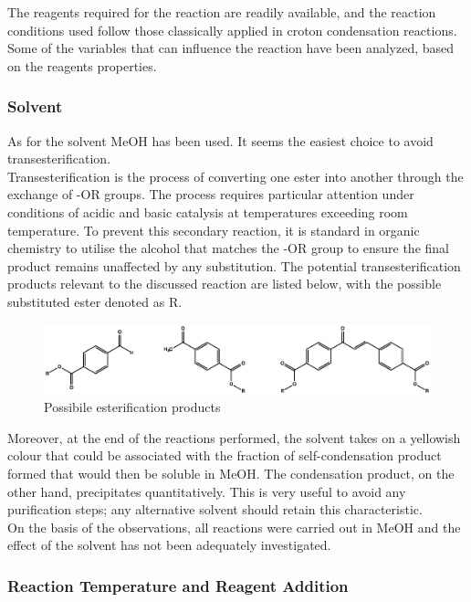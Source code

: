 \documentclass[../Master.tex]{subfiles}
\begin{document}
The reagents required for the reaction are readily available, and the reaction conditions used follow those classically applied in croton condensation reactions. Some of the variables that can influence the reaction have been analyzed, based on the reagents properties.

\subsubsection{Solvent}

As for the solvent MeOH has been used. It seems the easiest choice to avoid transesterification.\\
Transesterification is the process of converting one ester into another through the exchange of -OR groups. The process requires particular attention under conditions of acidic and basic catalysis at temperatures exceeding room temperature. To prevent this secondary reaction, it is standard in organic chemistry to utilise the alcohol that matches the -OR group to ensure the final product remains unaffected by any substitution.
The potential transesterification products relevant to the discussed reaction are listed below, with the possible substituted ester denoted as R.

\begin{figure}[h!]
	\centering
	\includegraphics[width=16cm,keepaspectratio]{Structures/esterification.eps}
	\caption{Possibile esterification products}
\end{figure}

Moreover, at the end of the reactions performed, the solvent takes on a yellowish colour that could be associated with the fraction of self-condensation product formed that would then be soluble in MeOH. The condensation product, on the other hand, precipitates quantitatively. This is very useful to avoid any purification steps; any alternative solvent should retain this characteristic.\\
On the basis of the observations, all reactions were carried out in MeOH and the effect of the solvent has not been adequately investigated.

\subsubsection{Reaction Temperature and Reagent Addition}
\end{document}
